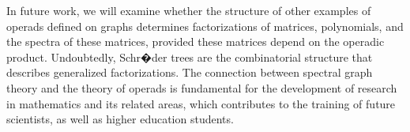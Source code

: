 \documentclass[11pt]{article}
\theoremstyle{definition}
\begin{document}
In future work, we will examine whether the structure of other examples of operads defined on graphs determines factorizations of matrices, polynomials, and the spectra of these matrices, provided these matrices depend on the operadic product. Undoubtedly, Schr�der trees are the combinatorial structure that describes generalized factorizations. The connection between spectral graph theory and the theory of operads is fundamental for the development of research in mathematics and its related areas, which contributes to the training of future scientists, as well as higher education students.



\end{document}
